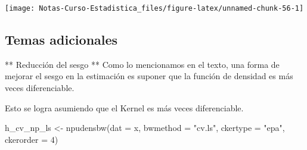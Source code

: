 \documentclass[
  12pt,
]{book}
\newenvironment{Shaded}{\begin{snugshade}}{\end{snugshade}}
\newcommand{\AttributeTok}[1]{\textcolor[rgb]{0.77,0.63,0.00}{#1}}
\newcommand{\DecValTok}[1]{\textcolor[rgb]{0.00,0.00,0.81}{#1}}
\newcommand{\FunctionTok}[1]{\textcolor[rgb]{0.00,0.00,0.00}{#1}}
\newcommand{\NormalTok}[1]{#1}
\newcommand{\OtherTok}[1]{\textcolor[rgb]{0.56,0.35,0.01}{#1}}
\newcommand{\SpecialCharTok}[1]{\textcolor[rgb]{0.00,0.00,0.00}{#1}}
\newcommand{\StringTok}[1]{\textcolor[rgb]{0.31,0.60,0.02}{#1}}
\begin{document}
\begin{Shaded}
\end{Shaded}

\begin{center}\texttt{[image: Notas-Curso-Estadistica\_files/figure-latex/unnamed-chunk-56-1]} \end{center}

\hypertarget{temas-adicionales}{%
\subsection{Temas adicionales}\label{temas-adicionales}}

** Reducción del sesgo ** Como lo mencionamos en el texto, una forma de
mejorar el sesgo en la estimación es suponer que la función de densidad
es más veces diferenciable.

Esto se logra asumiendo que el Kernel es más veces diferenciable.

\begin{Shaded}
\begin{Highlighting}[]
\NormalTok{h\_cv\_np\_ls }\OtherTok{\textless{}{-}} \FunctionTok{npudensbw}\NormalTok{(}\AttributeTok{dat =}\NormalTok{ x, }\AttributeTok{bwmethod =} \StringTok{"cv.ls"}\NormalTok{,}
    \AttributeTok{ckertype =} \StringTok{"epa"}\NormalTok{, }\AttributeTok{ckerorder =} \DecValTok{4}\NormalTok{)}
\end{Highlighting}
\end{Shaded}
\end{document}
